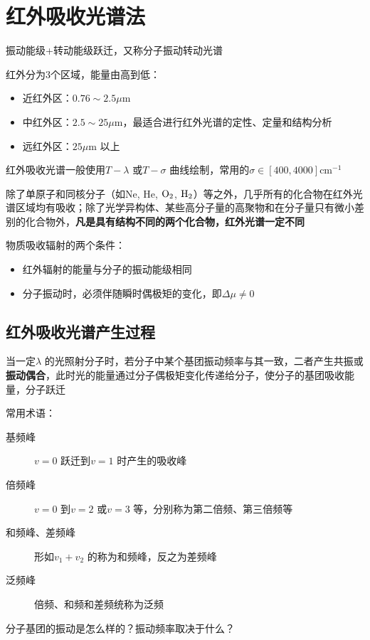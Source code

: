 \section{红外吸收光谱法}%
\label{sec:红外吸收光谱法}
\begin{notation}
    振动能级+转动能级跃迁，又称分子振动转动光谱
\end{notation}
红外分为3个区域，能量由高到低：
\begin{itemize}
    \item 近红外区：$0.76\sim 2.5\mu \text{m}$
    \item 中红外区：$2.5\sim 25\mu \text{m}$，最适合进行红外光谱的定性、定量和结构分析
    \item 远红外区：$25\mu \text{m}$ 以上
\end{itemize}
红外吸收光谱一般使用$T-\lambda$ 或$T-\sigma$ 曲线绘制，常用的$\sigma\in [400,4000]\text{cm}^{-1}$
\begin{notation}
    除了单原子和同核分子（如Ne, He, $\ce{O_2}$, $\ce{H_2}$）等之外，几乎所有的化合物在红外光谱区域均有吸收；除了光学异构体、某些高分子量的高聚物和在分子量只有微小差别的化合物外，\textbf{凡是具有结构不同的两个化合物，红外光谱一定不同}
\end{notation}
物质吸收辐射的两个条件：
\begin{itemize}
    \item 红外辐射的能量与分子的振动能级相同
    \item 分子振动时，必须伴随瞬时偶极矩的变化，即$\Delta\mu\neq 0$
\end{itemize}
\subsection{红外吸收光谱产生过程}%
\label{sub:红外吸收光谱产生过程}
当一定$\lambda$ 的光照射分子时，若分子中某个基团振动频率与其一致，二者产生共振或\textbf{振动偶合}，此时光的能量通过分子偶极矩变化传递给分子，使分子的基团吸收能量，分子跃迁
\begin{notation}
    常用术语：
    \begin{description}
        \item[基频峰] $v=0$ 跃迁到$v=1$ 时产生的吸收峰
        \item [倍频峰]$v=0$ 到$v=2$ 或$v=3$ 等，分别称为第二倍频、第三倍频等
        \item [和频峰、差频峰]形如$v_1+v_2$ 的称为和频峰，反之为差频峰
        \item [泛频峰]倍频、和频和差频统称为泛频
    \end{description}
\end{notation}
\begin{question}
    分子基团的振动是怎么样的？振动频率取决于什么？
\end{question}
